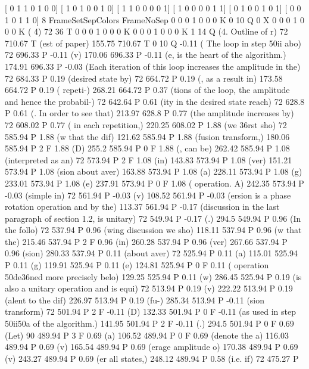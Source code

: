 [ 0 1 1 0 1 0 0]
[ 1 0 1 0 0 1 0]
[ 1 1 0 0 0 0 1]
[ 1 0 0 0 0 1 1]
[ 0 1 0 0 1 0 1]
[ 0 0 1 0 1 1 0]
 8 FrameSetSepColors
FrameNoSep
0 0 0 1 0 0 0 K
0 10 Q
0 X
0 0 0 1 0 0 0 K
(                                                                                        4) 72 36 T
0 0 0 1 0 0 0 K
0 0 0 1 0 0 0 K
1 14 Q
(4. Outline of r) 72 710.67 T
(est of paper) 155.75 710.67 T
0 10 Q
-0.11 ( The loop in step \050ii abo) 72 696.33 P
-0.11 (v) 170.06 696.33 P
-0.11 (e, is the heart of the algorithm.) 174.91 696.33 P
-0.03 (Each iteration of this loop increases the amplitude in the) 72 684.33 P
0.19 (desired state by) 72 664.72 P
0.19 (, as a result in) 173.58 664.72 P
0.19 ( repeti-) 268.21 664.72 P
0.37 (tions of the loop, the amplitude and hence the probabil-) 72 642.64 P
0.61 (ity in the desired state reach) 72 628.8 P
0.61 (. In order to see that) 213.97 628.8 P
0.77 (the amplitude increases by) 72 608.02 P
0.77 ( in each repetition,) 220.25 608.02 P
1.88 (we \336rst sho) 72 585.94 P
1.88 (w that the dif) 121.62 585.94 P
1.88 (fusion transform,) 180.06 585.94 P
2 F
1.88 (D) 255.2 585.94 P
0 F
1.88 (, can be) 262.42 585.94 P
1.08 (interpreted as an) 72 573.94 P
2 F
1.08 (in) 143.83 573.94 P
1.08 (ver) 151.21 573.94 P
1.08 (sion about aver) 163.88 573.94 P
1.08 (a) 228.11 573.94 P
1.08 (g) 233.01 573.94 P
1.08 (e) 237.91 573.94 P
0 F
1.08 ( operation. A) 242.35 573.94 P
-0.03 (simple in) 72 561.94 P
-0.03 (v) 108.52 561.94 P
-0.03 (ersion is a phase rotation operation and by the) 113.37 561.94 P
-0.17 (discussion in the last paragraph of section 1.2, is unitary) 72 549.94 P
-0.17 (.) 294.5 549.94 P
0.96 (In the follo) 72 537.94 P
0.96 (wing discussion we sho) 118.11 537.94 P
0.96 (w that the) 215.46 537.94 P
2 F
0.96 (in) 260.28 537.94 P
0.96 (ver) 267.66 537.94 P
0.96 (sion) 280.33 537.94 P
0.11 (about aver) 72 525.94 P
0.11 (a) 115.01 525.94 P
0.11 (g) 119.91 525.94 P
0.11 (e) 124.81 525.94 P
0 F
0.11 ( operation \050de\336ned more precisely belo) 129.25 525.94 P
0.11 (w) 286.45 525.94 P
0.19 (is also a unitary operation and is equi) 72 513.94 P
0.19 (v) 222.22 513.94 P
0.19 (alent to the dif) 226.97 513.94 P
0.19 (fu-) 285.34 513.94 P
-0.11 (sion transform) 72 501.94 P
2 F
-0.11 (D) 132.33 501.94 P
0 F
-0.11 (as used in step \050ii\050a of the algorithm.) 141.95 501.94 P
2 F
-0.11 (.) 294.5 501.94 P
0 F
0.69 (Let) 90 489.94 P
3 F
0.69 (a) 106.52 489.94 P
0 F
0.69 (denote the a) 116.03 489.94 P
0.69 (v) 165.54 489.94 P
0.69 (erage amplitude o) 170.38 489.94 P
0.69 (v) 243.27 489.94 P
0.69 (er all states,) 248.12 489.94 P
0.58 (i.e. if) 72 475.27 P
